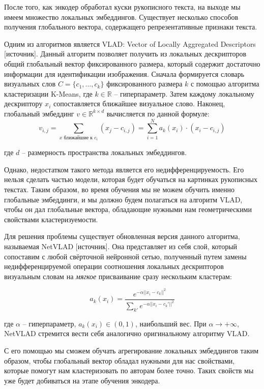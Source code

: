     После того, как энкодер обработал куски рукописного текста, на выходе мы имеем множество локальных эмбеддингов. Существует несколько способов получения глобального вектора, содержащего репрезентативные признаки текста. 

    Одним из алгоритмов является VLAD: Vector of Locally Aggregated Descriptors [источник]. Данный алгоритм позволяет получить из локальных дескрипторов общий глобальный вектор фиксированного размера, который содержит достаточно информации для идентификации изображения. Сначала формируется словарь визуальных слов $C = \{ c_1, \dots, c_k \}$ фиксированного размера $k$ с помощью алгоритма кластеризации K-Means, где $k \in \mathbb{R}$ -- гиперпараметр. Затем каждому локальному дескриптору $x_i$ сопоставляется ближайшее визуальное слово. Наконец, глобальный эмбеддинг $v \in \mathbb{R}^{k \times d}$ вычисляется по данной формуле:
    $$
        v_{i, j} = \sum_{x \text{ ближайшие к } c_i} (x_j - c_{i, j}) = \sum_{i = 1}^N a_k(x_i) \cdot (x_i - c_{i, j})
    $$

    \noindent
    где $d$ -- размерность пространства локальных эмбеддингов.

    Однако, недостатком такого метода является его недифференцируемость. Его нельзя сделать частью модели, которая будет обучаться на картинках рукописных текстах. Таким образом, во время обучения мы не можем обучить именно глобальные эмбеддинги, и мы должно будем полагаться на алгоритм VLAD, чтобы он дал глобальные вектора, обладающие нужными нам геометрическими свойствами кластеризуемости.
    
    Для решения проблемы существует обновленная версия данного алгоритма, называемая NetVLAD [источник]. Она представляет из себя слой, который сопоставим с любой свёрточной нейронной сетью, полученный путем замены недифференцируемой операции соотношения локальных дескрипторов визуальным словам на \textit{мягкое} присваивание сразу нескольким кластерам:
    
    $$
        a_k(x_i) = \frac{e^{- \alpha || x_i - c_k ||^2}}{\sum_{k'} e^{- \alpha || x_i - c_k' ||^2}}
    $$
    \smallskip

    \noindent
    где $\alpha$ -- гиперпараметр, $a_k(x_i) \in (0, 1)$, наибольший вес. При $\alpha \rightarrow + \infty$, \: NetVLAD стремится вести себя аналогично оригинальному алгоритму VLAD.

    С его помощью мы сможем обучать агрегирование локальных эмбеддингов таким образом, чтобы глобальный вектор обладал нужными для нас свойствами, которые помогут нам кластеризовать по авторам более точно. Таких свойств мы уже будет добиваться на этапе обучения энкодера.

